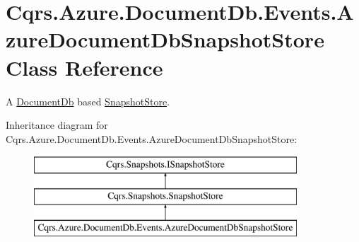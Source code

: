 \hypertarget{classCqrs_1_1Azure_1_1DocumentDb_1_1Events_1_1AzureDocumentDbSnapshotStore}{}\section{Cqrs.\+Azure.\+Document\+Db.\+Events.\+Azure\+Document\+Db\+Snapshot\+Store Class Reference}
\label{classCqrs_1_1Azure_1_1DocumentDb_1_1Events_1_1AzureDocumentDbSnapshotStore}


A \hyperlink{namespaceCqrs_1_1Azure_1_1DocumentDb}{Document\+Db} based \hyperlink{classCqrs_1_1Snapshots_1_1SnapshotStore_aa8ab186f864443c7d9647a4522864a84_aa8ab186f864443c7d9647a4522864a84}{Snapshot\+Store}.  


Inheritance diagram for Cqrs.\+Azure.\+Document\+Db.\+Events.\+Azure\+Document\+Db\+Snapshot\+Store\+:\begin{figure}[H]
\begin{center}
\leavevmode
\includegraphics[height=3.000000cm]{classCqrs_1_1Azure_1_1DocumentDb_1_1Events_1_1AzureDocumentDbSnapshotStore}
\end{center}
\end{figure}

